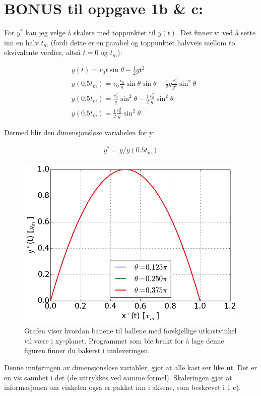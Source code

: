 
\pagebreak

\section*{BONUS til oppgave 1b \& c:}
For $y^*$ kan jeg velge å skalere med toppunktet til $y(t)$.
Det finner vi ved å sette inn en halv $t_m$ (fordi dette er en parabel
og toppunktet halvveis mellom to ekvivalente verdier, altså $t = 0$ og $t_m$):

\begin{align*}
    &y(t) = v_0t \sin{\theta} - \frac{1}{2}gt^2
    \\
    &y(0.5t_m) = v_0\frac{v_0}{g}\sin{\theta} \sin{\theta}
    - \frac{1}{2}g\frac{v_0^2}{g^2}\sin^2{\theta}
    \\
    &y(0.5t_m) = \frac{v_0^2}{g}\sin^2{\theta}
    - \frac{1}{2}\frac{v_0^2}{g}\sin^2{\theta}
    \\
    &y(0.5t_m) = \frac{1}{2}\frac{v_0^2}{g}\sin^2{\theta}
\end{align*}

Dermed blir den dimensjonsløse variabelen for y:

\begin{align*}
    y^* = y/y(0.5t_m)
\end{align*}

\begin{figure}[H]
		\centering
		\includegraphics[width=0.7\linewidth]{../alternativ_skalering.png}
		\caption{Grafen viser hvordan banene til ballene med forskjellige
        utkastvinkel vil være i xy-planet. Programmet som ble brukt for
        å lage denne figuren finner du bakerst i innleveringen.}
		\label{fig_alternativ}
\end{figure}

Denne innføringen av dimensjonsløse variabler, gjør at alle kast ser like ut.
Det er en vis sannhet i det (de uttrykkes ved samme formel). Skaleringen gjør
at informasjonen om vinkelen også er pakket inn i aksene, som beskrevet i 1 c).
\pagebreak

